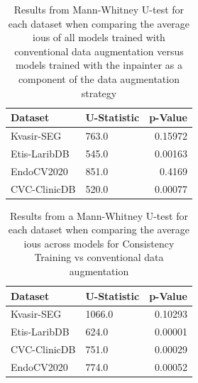 \begin{table}[htb]
    \centering
    \begin{tabularx}{\linewidth}{lXr}
        \toprule
        Dataset & U-Statistic & p-Value \\
        \midrule
            Kvasir-SEG & 763.0 & 0.15972 \\ 
            Etis-LaribDB & 545.0 & 0.00163 \\ 
            EndoCV2020 & 851.0 & 0.4169 \\ 
            CVC-ClinicDB & 520.0 & 0.00077 \\ 
        \bottomrule
    \end{tabularx}
    \caption[Mann-Whitney U-test results inpainter averaged across models]{Results from Mann-Whitney U-test for each dataset when comparing the average \glspl{iou} of all models trained with conventional data augmentation versus models trained with the inpainter as a component of the data augmentation strategy}
    \label{tab:ttest_avgs_inpainter}
\end{table}

\begin{table}[htb]
    \centering
    \begin{tabularx}{\linewidth}{lXr}
            \toprule
            Dataset & U-Statistic & p-Value \\
            \midrule
            Kvasir-SEG & 1066.0 & 0.10293 \\
            Etis-LaribDB & 624.0 & 0.00001\\
            CVC-ClinicDB & 751.0& 0.00029 \\
            EndoCV2020 & 774.0 & 0.00052    \\
            \bottomrule
        \end{tabularx}
        \caption[Mann-Whitney U-test results consistency training averaged across models]{Results from a Mann-Whitney U-test for each dataset when comparing the average \glspl{iou} across models for Consistency Training vs conventional data augmentation}
        \label{tab:ttest_avgs_consistency}
    \end{table}
    
